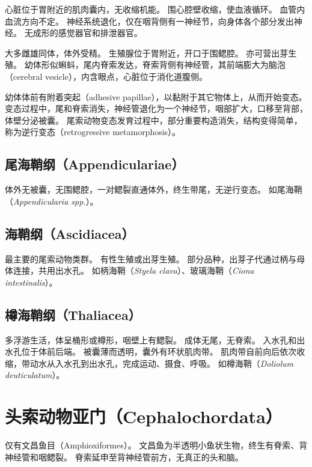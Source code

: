 \documentclass[11pt]{article}
\begin{document}
心脏位于胃附近的肌肉囊内，无收缩机能。
围心腔壁收缩，使血液循环。
血管内血流方向不定。
神经系统退化，仅在咽背侧有一神经节，向身体各个部分发出神经。
无成形的感觉器官和排泄器官。

\newline

大多雌雄同体，体外受精。
生殖腺位于胃附近，开口于围鳃腔。
亦可营出芽生殖。
幼体形似蝌蚪，尾内脊索发达，脊索背侧有神经管，其前端膨大为脑泡（cerebral vesicle），内含眼点，心脏位于消化道腹侧。

\newline

幼体体前有附着突起（adhesive papillae），以黏附于其它物体上，从而开始变态。
变态过程中，尾和脊索消失，神经管退化为一个神经节，咽部扩大，口移至背部，体壁分泌被囊。
尾索动物变态发育过程中，部分重要构造消失，结构变得简单，称为逆行变态（retrogressive metamorphosis）。

\subsection{尾海鞘纲（Appendiculariae）}
体外无被囊，无围鳃腔，一对鳃裂直通体外，终生带尾，无逆行变态。
如尾海鞘（\textit{Appendicularia spp.}）。

\subsection{海鞘纲（Ascidiacea）}
最主要的尾索动物类群。
有性生殖或出芽生殖。
部分品种，出芽子代通过柄与母体连接，共用出水孔。
如柄海鞘（\textit{Styela clava}）、玻璃海鞘（\textit{Ciona intestinalis}）。

\subsection{樽海鞘纲（Thaliacea）}
多浮游生活，体呈桶形或樽形，咽壁上有鳃裂。
成体无尾，无脊索。
入水孔和出水孔位于体前后端。
被囊薄而透明，囊外有环状肌肉带。
肌肉带自前向后依次收缩，带动水从入水孔到出水孔，完成运动、摄食、呼吸。
如樽海鞘（\textit{Doliolum deuticulatum}）。

\section{头索动物亚门（Cephalochordata）}
仅有文昌鱼目（Amphioxiformes）。
文昌鱼为半透明小鱼状生物，终生有脊索、背神经管和咽鳃裂。
脊索延申至背神经管前方，无真正的头和脑。

\newline
\end{document}
